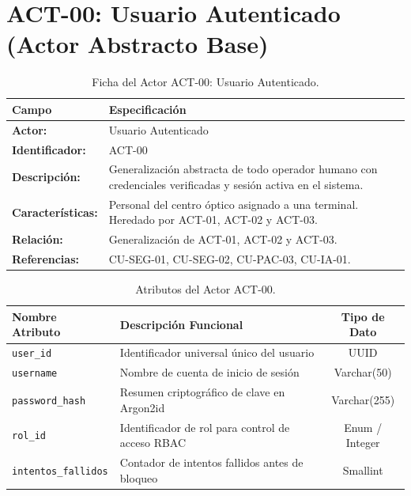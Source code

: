 \documentclass[12pt,a4paper]{report}
\begin{document}
\section{ACT-00: Usuario Autenticado (Actor Abstracto Base)}
\begin{table}[H]
\centering
\small
\begin{tabularx}{\textwidth}{|L{3.5cm}|X|}
\hline
{}\color{white}\textbf{Campo} & \color{white}\textbf{Especificación} \\
\hline
\textbf{Actor:} & Usuario Autenticado \\
\hline
\textbf{Identificador:} & ACT-00 \\
\hline
\textbf{Descripción:} & Generalización abstracta de todo operador humano con credenciales verificadas y sesión activa en el sistema. \\
\hline
\textbf{Características:} & Personal del centro óptico asignado a una terminal. Heredado por ACT-01, ACT-02 y ACT-03. \\
\hline
\textbf{Relación:} & Generalización de ACT-01, ACT-02 y ACT-03. \\
\hline
\textbf{Referencias:} & CU-SEG-01, CU-SEG-02, CU-PAC-03, CU-IA-01. \\
\hline
\end{tabularx}
\caption{Ficha del Actor ACT-00: Usuario Autenticado.}
\end{table}

\begin{table}[H]
\centering
\small
\begin{tabularx}{\textwidth}{|L{4.0cm}|X|c|}
\hline
{}\textbf{Nombre Atributo} & \textbf{Descripción Funcional} & \textbf{Tipo de Dato} \\
\hline
\texttt{user\_id} & Identificador universal único del usuario & UUID \\
\hline
\texttt{username} & Nombre de cuenta de inicio de sesión & Varchar(50) \\
\hline
\texttt{password\_hash} & Resumen criptográfico de clave en Argon2id & Varchar(255) \\
\hline
\texttt{rol\_id} & Identificador de rol para control de acceso RBAC & Enum / Integer \\
\hline
\texttt{intentos\_fallidos} & Contador de intentos fallidos antes de bloqueo & Smallint \\
\hline
\end{tabularx}
\caption{Atributos del Actor ACT-00.}
\end{table}
\end{document}
